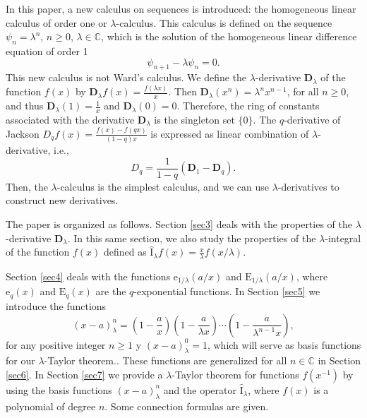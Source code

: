 \documentclass[12pt]{article}
\newcommand{\C}{\mathbb{C}}
\newcommand{\E}{\mathrm{E}}
\newcommand{\e}{\mathrm{e}}
\newcommand{\I}{\widehat{\mathrm{I}}}
\newcommand{\D}{\mathbf{D}}
\begin{document}
In this paper, a new calculus on sequences is introduced: the homogeneous linear calculus of order one or $\lambda$-calculus. This calculus is defined on the sequence $\psi_{n}=\lambda^n$, $n\geq0$, $\lambda\in\C$, which is the solution of the homogeneous linear difference equation of order 1
\begin{equation}\label{eqn_HLE}
    \psi_{n+1}-\lambda\psi_{n}=0.
\end{equation}
This new calculus is not Ward's calculus. We define the $\lambda$-derivative $\D_{\lambda}$ of the function $f(x)$ by $\D_{\lambda}f(x)=\frac{f(\lambda x)}{x}$. Then $\D_{\lambda}(x^{n})=\lambda^nx^{n-1}$, for all $n\geq0$, and thus $\D_{\lambda}(1)=\frac{1}{x}$ and $\D_{\lambda}(0)=0$. Therefore, the ring of constants associated with the derivative $\D_{\lambda}$ is the singleton set $\{0\}$. The $q$-derivative of Jackson $D_{q}f(x)=\frac{f(x)-f(qx)}{(1-q)x}$ is expressed as linear combination of $\lambda$-derivative, i.e., 
\begin{equation}
    D_{q}=\frac{1}{1-q}(\D_{1}-\D_{q}).
\end{equation}
Then, the $\lambda$-calculus is the simplest calculus, and we can use $\lambda$-derivatives to construct new derivatives. 

The paper is organized as follows. Section \ref{sec3} deals with the properties of the $\lambda$-derivative $\D_{\lambda}$. In this same section, we also study the properties of the $\lambda$-integral of the function $f(x)$ defined as $\I_{\lambda}f(x)=\frac{x}{\lambda}f(x/\lambda)$.

Section \ref{sec4} deals with the functions $\e_{1/\lambda}(a/x)$ and $\E_{1/\lambda}(a/x)$, where $\e_{q}(x)$ and $\E_{q}(x)$ are the $q$-exponential functions. In Section \ref{sec5} we introduce the functions
\begin{equation}
    (x-a)_{\lambda}^n=\left(1-\frac{a}{x}\right)\left(1-\frac{a}{\lambda x}\right)\cdots\left(1-\frac{a}{\lambda^{n-1}x}\right),
\end{equation}
for any positive integer $n\geq1$ y $(x-a)_{\lambda}^0=1$, which will serve as basis functions for our $\lambda$-Taylor theorem.. These functions are generalized for all $n\in\C$ in Section \ref{sec6}. In Section \ref{sec7} we provide a $\lambda$-Taylor theorem for functions $f(x^{-1})$ by using the basis functions $(x-a)_{\lambda}^n$ and the operator $\I_{\lambda}$, where $f(x)$ is a polynomial of degree $n$. Some connection formulas are given.
\end{document}
